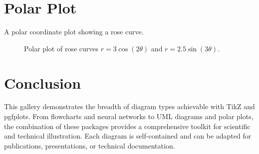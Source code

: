 \documentclass[
    language=english,
    doctype=article,
    institution=none,
    titlestyle=book,
]{../../omnilatex}
\begin{document}
\section{Polar Plot}
\label{sec:polar}

A polar coordinate plot showing a rose curve.

\begin{figure}[htbp]
    \centering
    \caption{Polar plot of rose curves $r = 3\cos(2\theta)$ and $r = 2.5\sin(3\theta)$.}
    \label{fig:polar}
\end{figure}

\section{Conclusion}
\label{sec:conclusion}

This gallery demonstrates the breadth of diagram types achievable with TikZ and
pgfplots. From flowcharts and neural networks to UML diagrams and polar plots,
the combination of these packages provides a comprehensive toolkit for
scientific and technical illustration. Each diagram is self-contained and can be
adapted for publications, presentations, or technical documentation.
\end{document}
